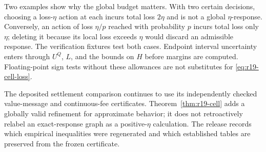 Two examples show why the global budget matters. With two certain decisions, choosing a loss-$\eta$ action at each incurs total loss $2\eta$ and is not a global $\eta$-response. Conversely, an action of loss $\eta/p$ reached with probability $p$ incurs total loss only $\eta$; deleting it because its local loss exceeds $\eta$ would discard an admissible response. The verification fixtures test both cases. Endpoint interval uncertainty enters through $U^Q$, $L$, and the bounds on $H$ before margins are computed. Floating-point sign tests without these allowances are not substitutes for \eqref{eq:r19-cell-loss}.

The deposited settlement comparison continues to use its independently checked value-message and continuous-fee certificates. Theorem~\ref{thm:r19-cell} adds a globally valid refinement for approximate behavior; it does not retroactively relabel an exact-response graph as a positive-$\eta$ calculation. The release records which empirical inequalities were regenerated and which established tables are preserved from the frozen certificate.
